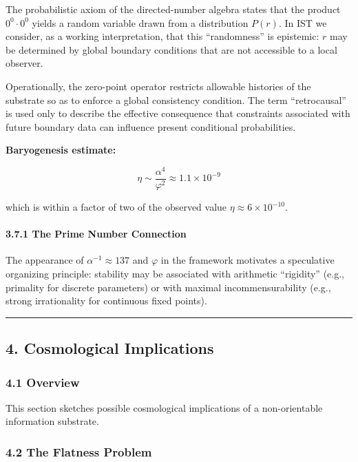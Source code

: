 \documentclass[
]{article}
\begin{document}
The probabilistic axiom of the directed-number algebra states that the
product \(0^0 \cdot 0^0\) yields a random variable drawn from a
distribution \(P(r)\). In IST we consider, as a working interpretation,
that this ``randomness'' is epistemic: \(r\) may be determined by global
boundary conditions that are not accessible to a local observer.

Operationally, the zero-point operator restricts allowable histories of
the substrate so as to enforce a global consistency condition. The term
``retrocausal'' is used only to describe the effective consequence that
constraints associated with future boundary data can influence present
conditional probabilities.

\textbf{Baryogenesis estimate:}

\[\eta \sim \frac{\alpha^4}{\varphi^2} \approx 1.1 \times 10^{-9}\]

which is within a factor of two of the observed value
\(\eta \approx 6 \times 10^{-10}\).

\paragraph{3.7.1 The Prime Number
Connection}\label{the-prime-number-connection}

The appearance of \(\alpha^{-1} \approx 137\) and \(\varphi\) in the
framework motivates a speculative organizing principle: stability may be
associated with arithmetic ``rigidity'' (e.g., primality for discrete
parameters) or with maximal incommensurability (e.g., strong
irrationality for continuous fixed points).

\begin{center}\rule{0.5\linewidth}{0.5pt}\end{center}

\subsection{4. Cosmological
Implications}\label{cosmological-implications}

\subsubsection{4.1 Overview}\label{overview-1}

This section sketches possible cosmological implications of a
non-orientable information substrate.

\subsubsection{4.2 The Flatness Problem}\label{the-flatness-problem}
\end{document}

